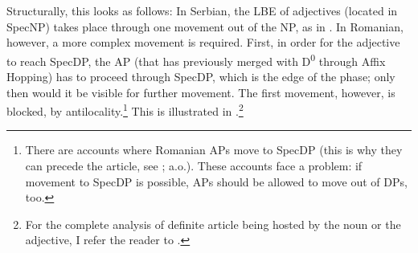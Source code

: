 \documentclass[output=paper,
hidelinks,
newtxmath,
]{langscibook}
\begin{document}
\ea \label{ex7}
	\z
\z

\noindent Structurally, this looks as follows: In Serbian, the LBE of adjectives (located in SpecNP) takes place through one movement out of the NP, as in . In Romanian, however, a more complex movement is required. First, in order for the adjective to reach SpecDP, the AP (that has previously merged with D\textsuperscript{0} through Affix Hopping) has to proceed through SpecDP, which is the edge of the phase; only then would it be visible for further movement. The first movement, however, is blocked, by antilocality.\footnote{\label{fn4}There are accounts where Romanian APs move to SpecDP (this is why they can precede the article, see \citealt{Abney1987,DobrovieSorin1993,Ungureanu2006}; a.o.). These accounts face a problem: if movement to SpecDP is possible, APs should be allowed to move out of DPs, too.} This is illustrated in .\footnote{\label{fn5}For the complete analysis of definite article being hosted by the noun or the adjective, I refer the reader to \citet{Petroj}.}
\end{document}
